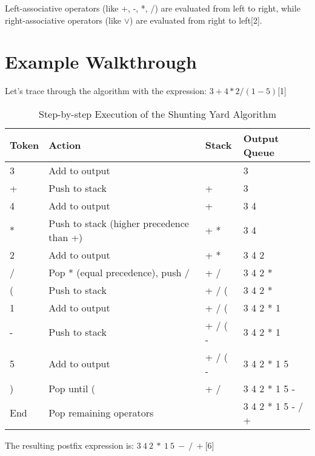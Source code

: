 \documentclass[a4paper,12pt]{article}
\begin{document}
Left-associative operators (like +, -, *, /) are evaluated from left to right, while right-associative operators (like $\vee$) are evaluated from right to left[2].

\section{Example Walkthrough}

Let's trace through the algorithm with the expression: $3 + 4 * 2 / (1 - 5)$[1]

\begin{table}[h]
    \centering
    \begin{tabular}{llll}
        \toprule
        \textbf{Token} & \textbf{Action} & \textbf{Stack} & \textbf{Output Queue} \\
        \midrule
        3 & Add to output & & 3 \\
        + & Push to stack & + & 3 \\
        4 & Add to output & + & 3 4 \\
        * & Push to stack (higher precedence than +) & + * & 3 4 \\
        2 & Add to output & + * & 3 4 2 \\
        / & Pop * (equal precedence), push / & + / & 3 4 2 * \\
        ( & Push to stack & + / ( & 3 4 2 * \\
        1 & Add to output & + / ( & 3 4 2 * 1 \\
        - & Push to stack & + / ( - & 3 4 2 * 1 \\
        5 & Add to output & + / ( - & 3 4 2 * 1 5 \\
        ) & Pop until ( & + / & 3 4 2 * 1 5 - \\
        End & Pop remaining operators & & 3 4 2 * 1 5 - / + \\
        \bottomrule
    \end{tabular}
    \caption{Step-by-step Execution of the Shunting Yard Algorithm}
    \label{tab:example}
\end{table}

The resulting postfix expression is: $3 \ 4 \ 2 \ * \ 1 \ 5 \ - \ / \ +$[6]
\end{document}
